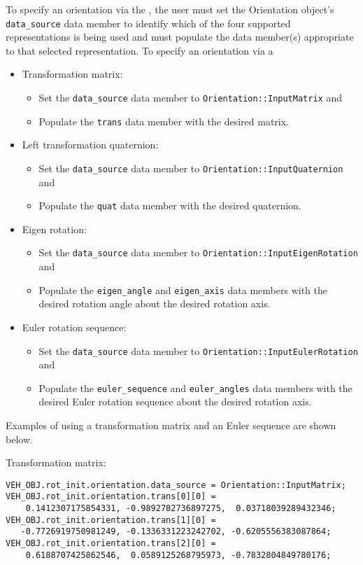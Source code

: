 To specify an orientation via the \ModelDesc, the user must set the Orientation
object's \verb|data_source| data member to identify which of the four supported
representations is being used and must populate the data member(s) appropriate
to that selected representation. To specify an orientation via a
\begin{itemize}
\item Transformation matrix:
  \begin{itemize}
  \item Set the \verb|data_source| data member to
    \verb|Orientation::InputMatrix| and
  \item Populate the \verb|trans| data member with the desired matrix.
  \end{itemize}
\item Left transformation quaternion:
  \begin{itemize}
  \item Set the \verb|data_source| data member to
    \verb|Orientation::InputQuaternion| and
  \item Populate the \verb|quat| data member with the desired quaternion.
  \end{itemize}
\item Eigen rotation:
  \begin{itemize}
  \item Set the \verb|data_source| data member to
    \verb|Orientation::InputEigenRotation| and
  \item Populate the \verb|eigen_angle| and \verb|eigen_axis| data members
    with the desired rotation angle about the desired rotation axis.
  \end{itemize}
\item Euler rotation sequence:
  \begin{itemize}
  \item Set the \verb|data_source| data member to
    \verb|Orientation::InputEulerRotation| and
  \item Populate the \verb|euler_sequence| and \verb|euler_angles| data members
    with the desired Euler rotation sequence about the desired rotation axis.
  \end{itemize}
\end{itemize}

Examples of using a transformation matrix and an Euler sequence are shown below.

Transformation matrix:
\begin{verbatim}
VEH_OBJ.rot_init.orientation.data_source = Orientation::InputMatrix;
VEH_OBJ.rot_init.orientation.trans[0][0] =
    0.1412307175854331, -0.9892782736897275,  0.03718039289432346;
VEH_OBJ.rot_init.orientation.trans[1][0] =
   -0.7726919750981249, -0.1336331223242702, -0.6205556383087864;
VEH_OBJ.rot_init.orientation.trans[2][0] =
    0.6188707425862546,  0.0589125268795973, -0.7832804849780176;
\end{verbatim}

